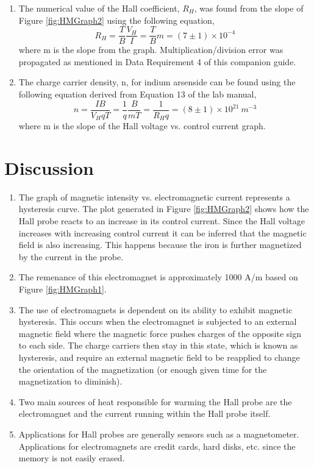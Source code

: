 \begin{enumerate}[resume]
\item The numerical value of the Hall coefficient, $R_H$, was found from the slope of Figure \ref{fig:HMGraph2} using the following equation,
$$
R_H=\frac{T}{B}\frac{V_H}{I}=\frac{T}{B}m = (7\pm1)\times10^{-4}
$$
where m is the slope from the graph. Multiplication/division error was propagated as mentioned in Data Requirement 4 of this companion guide.

\item The charge carrier density, n, for indium arsenside can be found using the following equation derived from Equation 13 of the lab manual,
$$
n=\frac{IB}{V_HqT}=\frac{1}{q}\frac{B}{mT}=\frac{1}{R_Hq}=(8\pm1)\times10^{21}\ m^{-3}
$$
where m is the slope of the Hall voltage vs. control current graph.
\end{enumerate}

\section{Discussion}

\begin{enumerate}[resume]
\item The graph of magnetic intensity vs. electromagnetic current represents a hysteresis curve. The plot generated in Figure \ref{fig:HMGraph2} shows how the Hall probe reacts to an increase in its control current. Since the Hall voltage increases with increasing control current it can be inferred that the magnetic field is also increasing. This happens because the iron is further magnetized by the current in the probe.
\item The remenance of this electromagnet is approximately 1000 A/m based on Figure \ref{fig:HMGraph1}.
\item The use of electromagnets is dependent on its ability to exhibit magnetic hysteresis. This occurs when the electromagnet is subjected to an external magnetic field where the magnetic force pushes charges of the opposite sign to each side. The charge carriers then stay in this state, which is known as hysteresis, and require an external magnetic field to be reapplied to change the orientation of the magnetization (or enough given time for the magnetization to diminish).
\item Two main sources of heat responsible for warming the Hall probe are the electromagnet and the current running within the Hall probe itself.
\item Applications for Hall probes are generally sensors such as a magnetometer. Applications for electromagnets are credit cards, hard disks, etc. since the memory is not easily erased.
\end{enumerate}

\AtEndDocument{\clearpage\ifodd\value{page}\else\null\clearpage\fi} %



